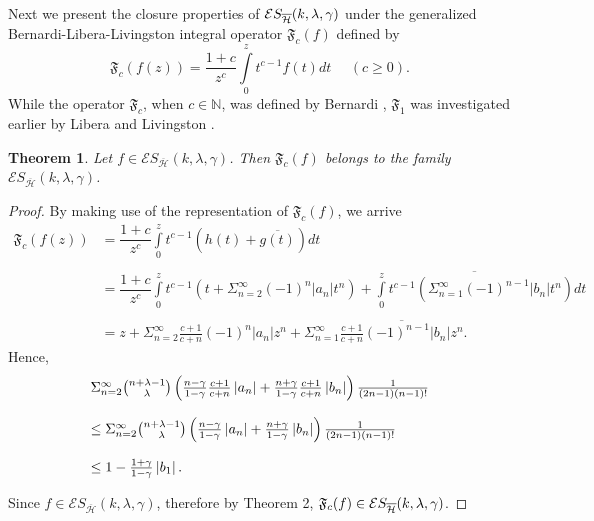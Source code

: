\documentclass[12pt,reqno]{amsart}
\newtheorem{theorem}{Theorem}
\begin{document}
Next we present the closure properties of $\mathcal{E}S_{%
\overline{\mathcal{H}}}(k,\lambda ,\gamma )$ under the generalized
Bernardi-Libera-Livingston integral operator $\mathfrak{F}_{c}(f)$
defined by%
\begin{equation}
\mathfrak{F}_{c}(f(z))=\frac{1+c}{z^{c}}\int\limits_{0}^{z}t^{c-1}f(t)dt\ \
\ \ \ \ (c\geq 0).  \label{O}
\end{equation}%
While the operator $\mathfrak{F}_{c}$, when $c\in \mathbb{N}$, was
defined by Bernardi \cite{ber}, $\mathfrak{F}_{1}$ was investigated earlier by Libera \cite{lib} and Livingston \cite{liv}.

\begin{theorem}
Let $f\in \mathcal{E}S_{\overline{\mathcal{H}}}(k,\lambda ,\gamma )$. Then $%
\mathfrak{F}_{c}(f)$ belongs to the family $\mathcal{E}S_{\overline{\mathcal{H%
}}}(k,\lambda ,\gamma )$.
\end{theorem}

\begin{proof}
By making use of the representation of $\mathfrak{F}_{c}(f)$, we arrive
\begin{equation*}
\begin{array}{ll}
\mathfrak{F}_{c}(f(z)) & =\dfrac{1+c}{z^{c}}\int\limits_{0}^{z}t^{c-1}\left(
h(t)+\overline{g(t)}\right) dt\  \\ 
&  \\ 
& =\dfrac{1+c}{z^{c}}\int\limits_{0}^{z}t^{c-1}\left(
t+\Sigma_{n=2}^{\infty}(-1)^{n}\left\vert a_{n}\right\vert
t^{n}\right) +\overline{\int\limits_{0}^{z}t^{c-1}\left(
\Sigma_{n=1}^{\infty}(-1)^{n-1}\left\vert b_{n}\right\vert
t^{n}\right) }dt\  \\ 
&  \\ 
& =z+\Sigma_{n=2}^{\infty}\frac{c+1}{c+n}(-1)^{n}\left\vert
a_{n}\right\vert z^{n}+\Sigma_{n=1}^{\infty}\overline{\frac{c+1}{c+n}%
(-1)^{n-1}\left\vert b_{n}\right\vert z^{n}}.%
\end{array}
\end{equation*}
Hence,
\begin{equation*}
\begin{array}{l}
\Sigma_{n=2}^{\infty}\binom{n+\lambda -1}{\lambda }\left( \frac{%
n-\gamma }{1-\gamma }\frac{c+1}{c+n}\left\vert a_{n}\right\vert +\frac{%
n+\gamma }{1-\gamma }\frac{c+1}{c+n}\left\vert b_{n}\right\vert \right) 
\frac{1}{(2n-1)(n-1)!} \\ 
\\ 
\leq \Sigma_{n=2}^{\infty}\binom{n+\lambda -1}{\lambda }\left( \frac{
n-\gamma }{1-\gamma }\left\vert a_{n}\right\vert +\frac{n+\gamma }{1-\gamma }
\left\vert b_{n}\right\vert \right) \frac{1}{(2n-1)(n-1)!} \\ 
\\ 
\leq 1-\frac{1+\gamma }{1-\gamma }\left\vert b_{1}\right\vert .%
\end{array}%
\end{equation*}

Since $f\in \mathcal{E}S_{\overline{\mathcal{H}}}(k,\lambda ,\gamma )$,
therefore by Theorem 2, $\mathfrak{F}_{c}(f)\in \mathcal{E}S_{\overline{%
\mathcal{H}}}(k,\lambda ,\gamma )$.
\end{proof}
\end{document}
